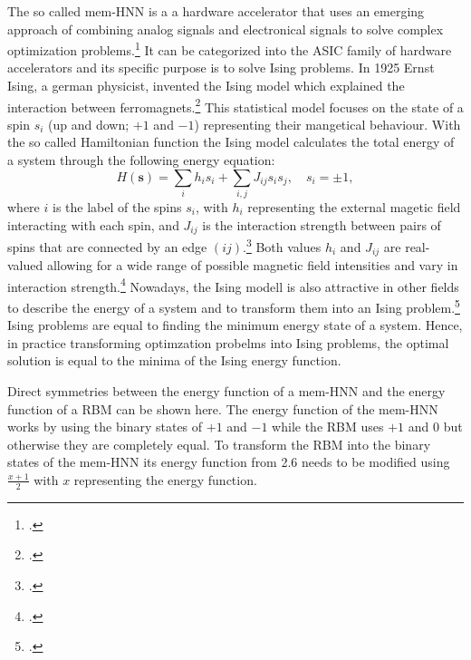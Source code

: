 The so called \ac{mem-HNN} is a a hardware accelerator that uses an emerging approach of combining analog signals and electronical signals to solve complex optimization problems.\footcite[cf.][410]{caiPowerefficientCombinatorialOptimization2020}
It can be categorized into the \ac{ASIC} family of hardware accelerators and its specific purpose is to solve Ising problems. 
In 1925 Ernst Ising, a german physicist, invented the Ising model which explained the interaction between ferromagnets.\footcite[cf.][253-258]{isingBeitragZurTheorie1925}
This statistical model focuses on the state of a spin \( s_{i} \) (up and down; \( +1 \) and \( -1 \)) representing their mangetical behaviour. 
With the so called Hamiltonian function the Ising model calculates the total energy of a system through the following energy equation:
\begin{equation}
    H(\mathbf{s}) = \sum_{i } h_i s_i + \sum_{i,j} J_{ij}s_{i}s_{j}, \quad s_i = \pm 1,
\end{equation}
where \( i \) is the label of the spins \( s_{i} \), with \( h_{i} \) representing the external magetic field  interacting with each spin, and \( J_{ij} \) is the interaction strength between pairs of spins that are connected by an edge \( (ij) \).\footcite[cf.][2]{tanahashiApplicationIsingMachines2019}
Both values \( h_{i} \) and  \( J_{ij} \) are real-valued allowing for a wide range of possible magnetic field intensities and vary in interaction strength.\footcite[cf.][1-2]{wangOscillatorbasedIsingMachine2017}
Nowadays, the Ising modell is also attractive in other fields to describe the energy of a system and to transform them into an Ising problem.\footcite[cf.][2-3]{tanahashiApplicationIsingMachines2019}
Ising problems are equal to finding the minimum energy state of a system.
Hence, in practice transforming optimzation probelms into Ising problems, the optimal solution is equal to the minima of the Ising energy function. 

Direct symmetries between the energy function of a \ac{mem-HNN} and the energy function of a \ac{RBM} can be shown here.
The energy function of the \ac{mem-HNN} works by using the binary states of \( +1 \) and \( -1 \) while the \ac{RBM} uses \( +1 \) and \( 0 \) but otherwise they are completely equal.
To transform the \ac{RBM} into the binary states of the \ac{mem-HNN} its energy function from 2.6 needs to be modified using \(\frac{x + 1}{2}\) with  \( x \) representing the energy function.

